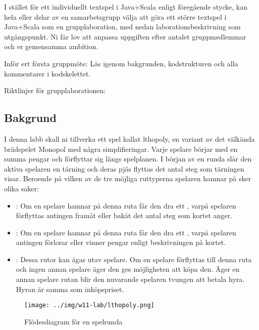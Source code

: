 I stället för ett individuellt textspel i Java+Scala enligt föregående stycke, kan hela eller delar av en samarbetsgrupp välja att göra ett större textspel i Java+Scala som en grupplaboration, med nedan laborationsbeskrivning som utgångspunkt. Ni får lov att anpassa uppgiften efter antalet gruppmedlemmar och er gemensamma ambition.

Inför ert första gruppmöte: Läs igenom bakgrunden, kodstrukturen och alla kommentarer i kodskelettet.

Riktlinjer för grupplaborationen:
\begin{itemize}[nolistsep]

\end{itemize}

\subsection{Bakgrund}
I denna labb skall ni tillverka ett spel kallat lthopoly, en variant av det välkända brädspelet Monopol med några simplifieringar. Varje spelare börjar med en summa pengar och förflyttar sig längs spelplanen.
I början av en runda slår den aktiva spelaren en tärning och deras pjäs flyttas det antal steg som tärningen visar.
Beroende på vilken av de tre möjliga ruttyperna spelaren hamnar på sker olika saker:

\begin{itemize}
\item {}: Om en spelare hamnar på denna ruta får den dra ett , varpå spelaren förflyttas antingen framåt eller bakåt det antal steg som kortet anger.
\item {}: Om en spelare hamnar på denna ruta får den dra ett , varpå spelaren antingen förlorar eller vinner pengar enligt beskrivningen på kortet.
\item {}: Dessa rutor kan ägas utav spelare. Om en spelare förflyttas till denna ruta och ingen annan spelare äger den ges möjligheten att köpa den. Äger en annan spelare rutan blir den nuvarande spelaren tvungen att betala hyra. Hyran är samma som inköpspriset.
\end{itemize}

\begin{figure}[H]
\centering
\texttt{[image: ../img/w11-lab/lthopoly.png]}
\caption {Flödesdiagram för en spelrunda}
\label{fig:scalajava:lthopoly-team:flowchart}
\end{figure}

